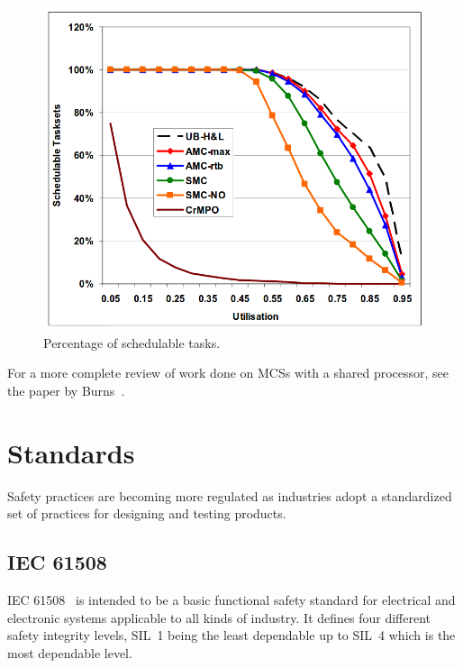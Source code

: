 \begin{figure}[H]
\centering
\includegraphics[width=\textwidth]{./img/literature_schedulers.png}
\caption{Percentage of schedulable tasks.~\cite{baruah2011}}\label{fig:schedulers}
\end{figure}

For a more complete review of work done on MCSs with a shared processor, see the paper by Burns~\cite{burns2016}.




\section{Standards}
Safety practices are becoming more regulated as industries adopt a standardized set of practices for designing and testing products. %

\subsection{IEC 61508}
IEC 61508~\cite{IEC61508} is intended to be a basic functional safety standard for electrical and electronic systems applicable to all kinds of industry. It defines four different safety integrity levels, SIL~1 being the least dependable up to SIL~4 which is the most dependable level.

